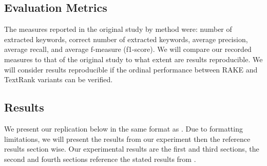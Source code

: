 \documentclass[11pt,a4paper]{article}
\begin{document}
\subsection{Evaluation Metrics}

The measures reported in the original study by method were: number of extracted keywords, correct number of extracted keywords, average precision, average recall, and average f-measure (f1-score).  We will compare our recorded measures to that of the original study to what extent are  results reproducible. We will consider  results reproducible if the ordinal performance between RAKE and TextRank variants can be verified. 

\subsection{Results}

We present our replication below in the same format as \citet{1}. Due to formatting limitations, we will present the results from our experiment then the reference results section wise. Our experimental results are the first and third sections, the second and fourth sections reference the stated results from \citet{1}.
\end{document}
